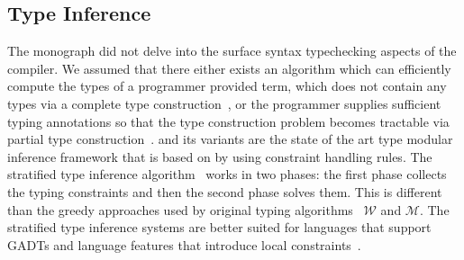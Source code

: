 \documentclass[screen,nonacm,manuscript,review]{acmart} %
\begin{document}
\subsection{Type Inference}\label{sec:rw-type-inf}
The monograph did not delve into the surface syntax typechecking aspects of the
compiler. We assumed that there either exists an algorithm which can
efficiently compute the types of a programmer provided term, which
does not contain any types via a complete type
construction~\cite{milner_theory_1978}, or the  programmer supplies
sufficient typing annotations so that the type construction problem
becomes tractable via partial type
construction~\cite{pierce_local_2000, dunfield_bidirectional_2021}.
\HMX and its variants are the state of the art type modular inference
framework that is based on by using constraint handling rules. The
stratified type inference algorithm~\cite{pottier_stratified_2006} works in two
phases: the first phase collects the typing constraints and then the
second phase solves them. This is different than the greedy approaches
used by original typing algorithms~\cite{lee_proofs_1998} $\mathcal{W}$
and $\mathcal{M}$. The stratified type inference systems are better
suited for languages that support GADTs and language features that
introduce local constraints~\cite{vytiniotis_outsideinx_2011}.
\end{document}
